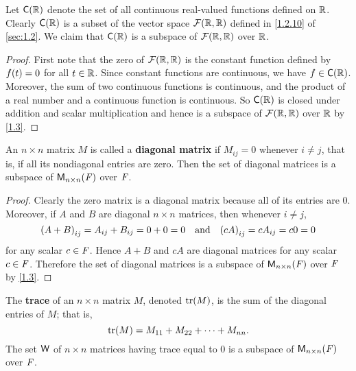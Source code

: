 \begin{eg}\label{1.3.7}
  Let \(\cfs{\R}\) denote the set of all continuous real-valued functions defined on \(\mathbb{R}\).
  Clearly \(\cfs{\R}\) is a subset of the vector space \(\fs{\R}{\R}\) defined in \cref{1.2.10} of \cref{sec:1.2}.
  We claim that \(\cfs{\R}\) is a subspace of \(\fs{\R}{\R}\) over \(\mathbb{R}\).
\end{eg}

\begin{proof}
  First note that the zero of \(\fs{\R}{\R}\) is the constant function defined by \(f\p{t} = 0\) for all \(t \in \mathbb{R}\).
  Since constant functions are continuous, we have \(f \in \cfs{\R}\).
  Moreover, the sum of two continuous functions is continuous, and the product of a real number and a continuous function is continuous.
  So \(\cfs{\R}\) is closed under addition and scalar multiplication and hence is a subspace of \(\fs{\R}{\R}\) over \(\mathbb{R}\) by \cref{1.3}.
\end{proof}

\begin{eg}\label{1.3.8}
  An \(n \times n\) matrix \(M\) is called a \textbf{diagonal matrix} if \(M_{i j} = 0\) whenever \(i \neq j\), that is, if all its nondiagonal entries are zero.
  Then the set of diagonal matrices is a subspace of \(\mathsf{M}_{{n} \times n}({\mathit{F}})\) over \(\mathit{F}\).
\end{eg}

\begin{proof}
  Clearly the zero matrix is a diagonal matrix because all of its entries are \(0\).
  Moreover, if \(A\) and \(B\) are diagonal \(n \times n\) matrices, then whenever \(i \neq j\),
  \[
    \p{A + B}_{i j} = A_{i j} + B_{i j} = 0 + 0 = 0 \quad \text{and} \quad \p{cA}_{i j} = cA_{i j} = c0 = 0
  \]
  for any scalar \(c \in \mathit{F}\).
  Hence \(A + B\) and \(cA\) are diagonal matrices for any scalar \(c \in \mathit{F}\).
  Therefore the set of diagonal matrices is a subspace of \(\mathsf{M}_{{n} \times n}({\mathit{F}})\) over \(\mathit{F}\) by \cref{1.3}.
\end{proof}

\begin{eg}\label{1.3.9}
  The \textbf{trace} of an \(n \times n\) matrix \(M\), denoted \(\tr{M}\), is the sum of the diagonal entries of \(M\);
  that is,
  \[
    \tr{M} = M_{1 1} + M_{2 2} + \dots + M_{n n}.
  \]
  The set \(\mathsf{W}\) of \(n \times n\) matrices having trace equal to \(0\) is a subspace of \(\mathsf{M}_{{n} \times n}({\mathit{F}})\) over \(\mathit{F}\).
\end{eg}

